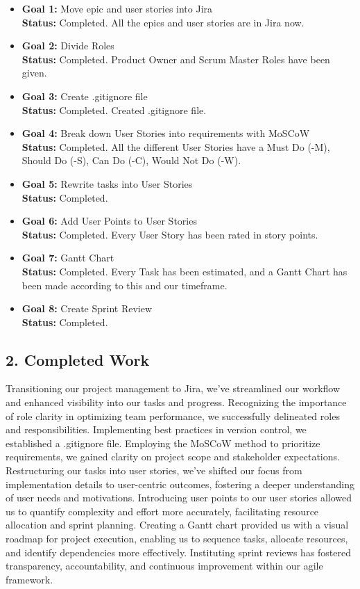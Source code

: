 \documentclass[12pt]{report}
\begin{document}
\begin{itemize}
    \item \textbf{Goal 1:} Move epic and user stories into Jira\\
    \textbf{Status:} Completed. All the epics and user stories are in Jira now.
    \item \textbf{Goal 2:} Divide Roles\\
    \textbf{Status:} Completed. Product Owner and Scrum Master Roles have been given.
    \item \textbf{Goal 3:} Create .gitignore file\\
    \textbf{Status:} Completed. Created .gitignore file.
    \item \textbf{Goal 4:} Break down User Stories into requirements with MoSCoW\\
    \textbf{Status:} Completed. All the different User Stories have a Must Do (-M), Should Do (-S), Can Do (-C), Would Not Do (-W).
    \item \textbf{Goal 5:} Rewrite tasks into User Stories\\
    \textbf{Status:} Completed.
    \item \textbf{Goal 6:} Add User Points to User Stories\\
    \textbf{Status:} Completed. Every User Story has been rated in story points.
    \item \textbf{Goal 7:} Gantt Chart\\
    \textbf{Status:} Completed. Every Task has been estimated, and a Gantt Chart has been made according to this and our timeframe.
    \item \textbf{Goal 8:} Create Sprint Review\\
    \textbf{Status:} Completed.
\end{itemize}

\subsection*{2. Completed Work}
Transitioning our project management to Jira, we've streamlined our workflow and enhanced visibility into our tasks and progress. Recognizing the importance of role clarity in optimizing team performance, we successfully delineated roles and responsibilities. Implementing best practices in version control, we established a .gitignore file. Employing the MoSCoW method to prioritize requirements, we gained clarity on project scope and stakeholder expectations. Restructuring our tasks into user stories, we've shifted our focus from implementation details to user-centric outcomes, fostering a deeper understanding of user needs and motivations. Introducing user points to our user stories allowed us to quantify complexity and effort more accurately, facilitating resource allocation and sprint planning. Creating a Gantt chart provided us with a visual roadmap for project execution, enabling us to sequence tasks, allocate resources, and identify dependencies more effectively. Instituting sprint reviews has fostered transparency, accountability, and continuous improvement within our agile framework.
\end{document}
